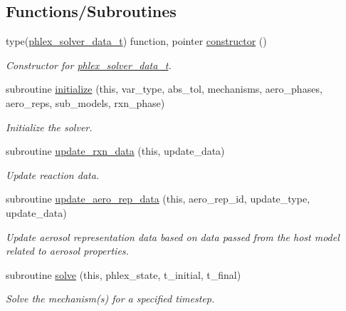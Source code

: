 \subsection*{Functions/\+Subroutines}
\begin{DoxyCompactItemize}
\item 
type(\mbox{\hyperlink{structpmc__phlex__solver__data_1_1phlex__solver__data__t}{phlex\+\_\+solver\+\_\+data\+\_\+t}}) function, pointer \mbox{\hyperlink{namespacepmc__phlex__solver__data_a30e0f4b080777d62bb7ee6c91f8612f5}{constructor}} ()
\begin{DoxyCompactList}\small\item\em Constructor for \mbox{\hyperlink{structpmc__phlex__solver__data_1_1phlex__solver__data__t}{phlex\+\_\+solver\+\_\+data\+\_\+t}}. \end{DoxyCompactList}\item 
subroutine \mbox{\hyperlink{namespacepmc__phlex__solver__data_ad82755c7a410cb104af0926103fec0ab}{initialize}} (this, var\+\_\+type, abs\+\_\+tol, mechanisms, aero\+\_\+phases, aero\+\_\+reps, sub\+\_\+models, rxn\+\_\+phase)
\begin{DoxyCompactList}\small\item\em Initialize the solver. \end{DoxyCompactList}\item 
subroutine \mbox{\hyperlink{namespacepmc__phlex__solver__data_ae05845ca2e0a3a239fa99a4e192c0dbb}{update\+\_\+rxn\+\_\+data}} (this, update\+\_\+data)
\begin{DoxyCompactList}\small\item\em Update reaction data. \end{DoxyCompactList}\item 
subroutine \mbox{\hyperlink{namespacepmc__phlex__solver__data_a01cf4ead58b0d4c2e250705bb54b1136}{update\+\_\+aero\+\_\+rep\+\_\+data}} (this, aero\+\_\+rep\+\_\+id, update\+\_\+type, update\+\_\+data)
\begin{DoxyCompactList}\small\item\em Update aerosol representation data based on data passed from the host model related to aerosol properties. \end{DoxyCompactList}\item 
subroutine \mbox{\hyperlink{namespacepmc__phlex__solver__data_a9c7300944e2df22a9a4d3592679e7eca}{solve}} (this, phlex\+\_\+state, t\+\_\+initial, t\+\_\+final)
\begin{DoxyCompactList}\small\item\em Solve the mechanism(s) for a specified timestep. \end{DoxyCompactList}\item 

\end{DoxyCompactItemize}
